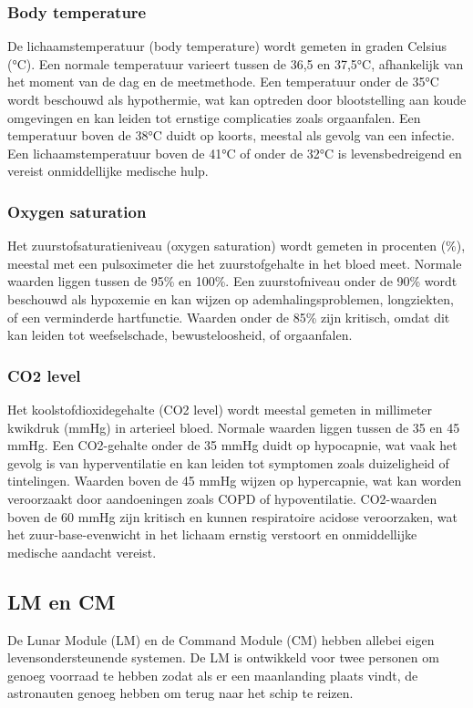 \subsubsection{Body temperature}
De lichaamstemperatuur (body temperature) wordt gemeten in graden Celsius (°C). Een normale temperatuur varieert tussen de 36,5 en 37,5°C, afhankelijk van het moment van de dag en de meetmethode. Een temperatuur onder de 35°C wordt beschouwd als hypothermie, wat kan optreden door blootstelling aan koude omgevingen en kan leiden tot ernstige complicaties zoals orgaanfalen. Een temperatuur boven de 38°C duidt op koorts, meestal als gevolg van een infectie. Een lichaamstemperatuur boven de 41°C of onder de 32°C is levensbedreigend en vereist onmiddellijke medische hulp.

\subsubsection{Oxygen saturation}
Het zuurstofsaturatieniveau (oxygen saturation) wordt gemeten in procenten (\%), meestal met een pulsoximeter die het zuurstofgehalte in het bloed meet. Normale waarden liggen tussen de 95\% en 100\%. Een zuurstofniveau onder de 90\% wordt beschouwd als hypoxemie en kan wijzen op ademhalingsproblemen, longziekten, of een verminderde hartfunctie. Waarden onder de 85\% zijn kritisch, omdat dit kan leiden tot weefselschade, bewusteloosheid, of orgaanfalen.

\subsubsection{CO2 level}
Het koolstofdioxidegehalte (CO2 level) wordt meestal gemeten in millimeter kwikdruk (mmHg) in arterieel bloed. Normale waarden liggen tussen de 35 en 45 mmHg. Een CO2-gehalte onder de 35 mmHg duidt op hypocapnie, wat vaak het gevolg is van hyperventilatie en kan leiden tot symptomen zoals duizeligheid of tintelingen. Waarden boven de 45 mmHg wijzen op hypercapnie, wat kan worden veroorzaakt door aandoeningen zoals COPD of hypoventilatie. CO2-waarden boven de 60 mmHg zijn kritisch en kunnen respiratoire acidose veroorzaken, wat het zuur-base-evenwicht in het lichaam ernstig verstoort en onmiddellijke medische aandacht vereist.


\subsection{LM en CM}
De Lunar Module (LM) en de Command Module (CM) hebben allebei eigen levensondersteunende systemen. De LM is ontwikkeld voor twee personen om genoeg voorraad te hebben zodat als er een maanlanding plaats vindt, de astronauten genoeg hebben om terug naar het schip te reizen. 

